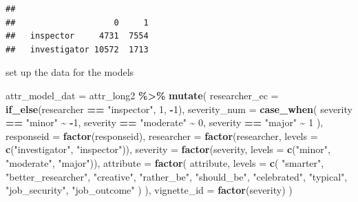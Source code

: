 \documentclass[
]{article}
\newenvironment{Shaded}{\begin{snugshade}}{\end{snugshade}}
\newcommand{\AttributeTok}[1]{\textcolor[rgb]{0.13,0.29,0.53}{#1}}
\newcommand{\DecValTok}[1]{\textcolor[rgb]{0.00,0.00,0.81}{#1}}
\newcommand{\FunctionTok}[1]{\textcolor[rgb]{0.13,0.29,0.53}{\textbf{#1}}}
\newcommand{\NormalTok}[1]{#1}
\newcommand{\OtherTok}[1]{\textcolor[rgb]{0.56,0.35,0.01}{#1}}
\newcommand{\SpecialCharTok}[1]{\textcolor[rgb]{0.81,0.36,0.00}{\textbf{#1}}}
\newcommand{\StringTok}[1]{\textcolor[rgb]{0.31,0.60,0.02}{#1}}
\begin{document}
\begin{Shaded}
\end{Shaded}

\begin{verbatim}
##               
##                    0     1
##   inspector     4731  7554
##   investigator 10572  1713
\end{verbatim}

set up the data for the models

\begin{Shaded}
\begin{Highlighting}[]
\NormalTok{attr\_model\_dat }\OtherTok{=}\NormalTok{ attr\_long2 }\SpecialCharTok{\%\textgreater{}\%}
  \FunctionTok{mutate}\NormalTok{(}
    \AttributeTok{researcher\_ec =} \FunctionTok{if\_else}\NormalTok{(researcher }\SpecialCharTok{==} \StringTok{"inspector"}\NormalTok{, }\DecValTok{1}\NormalTok{, }\SpecialCharTok{{-}}\DecValTok{1}\NormalTok{),}
    \AttributeTok{severity\_num =} \FunctionTok{case\_when}\NormalTok{(}
\NormalTok{      severity }\SpecialCharTok{==} \StringTok{"minor"} \SpecialCharTok{\textasciitilde{}} \SpecialCharTok{{-}}\DecValTok{1}\NormalTok{,}
\NormalTok{      severity }\SpecialCharTok{==} \StringTok{"moderate"} \SpecialCharTok{\textasciitilde{}} \DecValTok{0}\NormalTok{,}
\NormalTok{      severity }\SpecialCharTok{==} \StringTok{"major"} \SpecialCharTok{\textasciitilde{}} \DecValTok{1}
\NormalTok{    ),}
    \AttributeTok{responseid =} \FunctionTok{factor}\NormalTok{(responseid),}
    \AttributeTok{researcher =} \FunctionTok{factor}\NormalTok{(researcher, }\AttributeTok{levels =} \FunctionTok{c}\NormalTok{(}\StringTok{"investigator"}\NormalTok{, }\StringTok{"inspector"}\NormalTok{)),}
    \AttributeTok{severity =} \FunctionTok{factor}\NormalTok{(severity, }\AttributeTok{levels =} \FunctionTok{c}\NormalTok{(}\StringTok{"minor"}\NormalTok{, }\StringTok{"moderate"}\NormalTok{, }\StringTok{"major"}\NormalTok{)),}
    \AttributeTok{attribute =} \FunctionTok{factor}\NormalTok{(}
\NormalTok{      attribute,}
      \AttributeTok{levels =} \FunctionTok{c}\NormalTok{(}
        \StringTok{"smarter"}\NormalTok{,}
        \StringTok{"better\_researcher"}\NormalTok{,}
        \StringTok{"creative"}\NormalTok{,}
        \StringTok{"rather\_be"}\NormalTok{,}
        \StringTok{"should\_be"}\NormalTok{,}
        \StringTok{"celebrated"}\NormalTok{,}
        \StringTok{"typical"}\NormalTok{,}
        \StringTok{"job\_security"}\NormalTok{,}
        \StringTok{"job\_outcome"}
\NormalTok{      )}
\NormalTok{    ),}
    \AttributeTok{vignette\_id =} \FunctionTok{factor}\NormalTok{(severity)}
\NormalTok{  )}
\end{Highlighting}
\end{Shaded}
\end{document}
